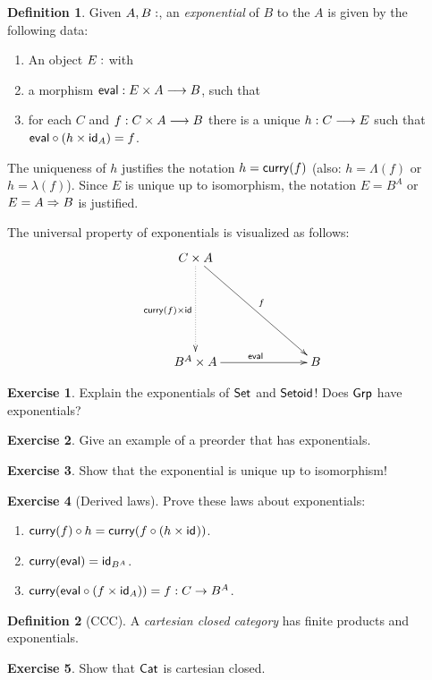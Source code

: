 \documentclass[a4paper,fleqn]{scrartcl}
\theoremstyle{definition}
\newtheorem{definition}{Definition}
\newtheorem{exercise}{Exercise}
\let\C\relax %
\newcommand{\C}{\mathcal{C}}
\begin{document}
\begin{definition}
  Given $A,B : \C$, an \emph{exponential} of $B$ to the $A$ is given
  by the following data:
  \begin{enumerate}
  \item An object $E : \C$ with
  \item a morphism $\teval : E \times A \too B$, such that
  \item for each $C$ and $f : C \times A \too B$ there is a unique $h
    : C \too E$ such that $\teval \comp (h \times \id[A]) = f$.
  \end{enumerate}
  The uniqueness of $h$ justifies the notation $h = \tcurry(f)$ (also:
  $h = \Lambda(f)$ or $h = \lambda(f)$).
  Since $E$ is unique up to isomorphism, the notation $E = B^A$ or $E
  = A \To B$ is justified.
\end{definition}
The universal property of exponentials is visualized as follows:
\[
\xymatrix@=16ex{
  C \times A \ar@{.>}[d]_{\tcurry(f) \times \tid}
      \ar[dr]^{f}\\
  B^A \times A \ar[r]^{\teval} & B \\
}
\]
\begin{exercise}
  Explain the exponentials of $\Set$ and $\Setoid$!
  Does $\Grp$ have exponentials?
\end{exercise}
\begin{exercise}
  Give an example of a preorder that has exponentials.
\end{exercise}
\begin{exercise}
  Show that the exponential is unique up to isomorphism!
\end{exercise}
\begin{exercise}[Derived laws]
   Prove these laws about exponentials:
   \begin{enumerate}
   \item $\tcurry(f) \comp h = \tcurry(f \comp (h \times \id))$.
   \item $\tcurry(\teval) = \id[B^A]$.
   \item $\tcurry(\teval \comp (f \times \id[A])) = f : C \to B^A$.
   \end{enumerate}
\end{exercise}

\begin{definition}[CCC]
  A \emph{cartesian closed category} has finite products and exponentials.
\end{definition}
\begin{exercise}
  Show that $\Cat$ is cartesian closed.
\end{exercise}
\end{document}
